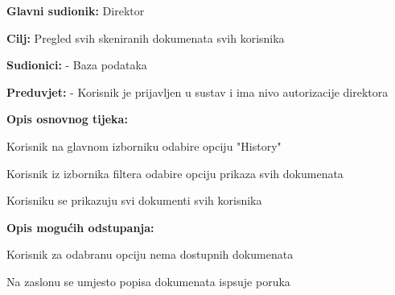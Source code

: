 					\noindent {}
						\begin{packed_item}
		
							\item \textbf{Glavni sudionik:} Direktor
							\item  \textbf{Cilj:} Pregled svih skeniranih dokumenata svih korisnika
							\item  \textbf{Sudionici:} - Baza podataka
							\item  \textbf{Preduvjet:} - Korisnik je prijavljen u sustav i ima nivo autorizacije direktora
							\item  \textbf{Opis osnovnog tijeka:}
							
							\item[] \begin{packed_enum}
								\item Korisnik na glavnom izborniku odabire opciju "History"
								\item Korisnik iz izbornika filtera odabire opciju prikaza svih dokumenata
								\item Korisniku se prikazuju svi dokumenti svih korisnika
							\end{packed_enum}
							
							\item  \textbf{Opis mogućih odstupanja:}
							
							\item[] \begin{packed_item}
		
								\item[3.a]Korisnik za odabranu opciju nema dostupnih dokumenata
								\item[] \begin{packed_enum}
									\item Na zaslonu se umjesto popisa dokumenata ispsuje poruka
								\end{packed_enum}
							\end{packed_item}
						\end{packed_item}

